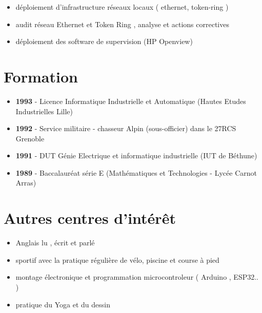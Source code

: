 \documentclass[11pt,a4paper]{moderncv}
\begin{document}
 {}{
\begin{itemize}%
  \item déploiement d'infrastructure réseaux locaux ( ethernet, token-ring  ) 
   \item audit réseau Ethernet et Token Ring , analyse et actions correctives 
   \item déploiement des software de supervision (HP Openview)   \newline
\end{itemize}}


\section{Formation}
\cventry{}{} {}{} {} {
\begin{itemize}
 \item \textbf{ 1993 } - Licence Informatique Industrielle et Automatique (Hautes Etudes Industrielles Lille) 
 \item \textbf{ 1992 } - Service militaire - chasseur Alpin (sous-officier) dans le 27RCS Grenoble 
 \item \textbf{ 1991 } - DUT Génie Electrique et informatique industrielle (IUT de Béthune) 
 \item \textbf{ 1989 } - Baccalauréat série E (Mathématiques et Technologies - Lycée Carnot Arras)   \newline
 \end{itemize}}

\section{Autres centres d'intérêt}
\cventry{}{} {}{} {} {
\begin{itemize}
 \item  Anglais lu , écrit et parlé   
 \item  sportif avec la pratique régulière de vélo, piscine et course à pied  
 \item  montage électronique et programmation microcontroleur ( Arduino , ESP32.. ) 
 \item  pratique du Yoga et du dessin 
 \end{itemize}}
 
\vfill
\enlargethispage{\footskip}
\end{document}
